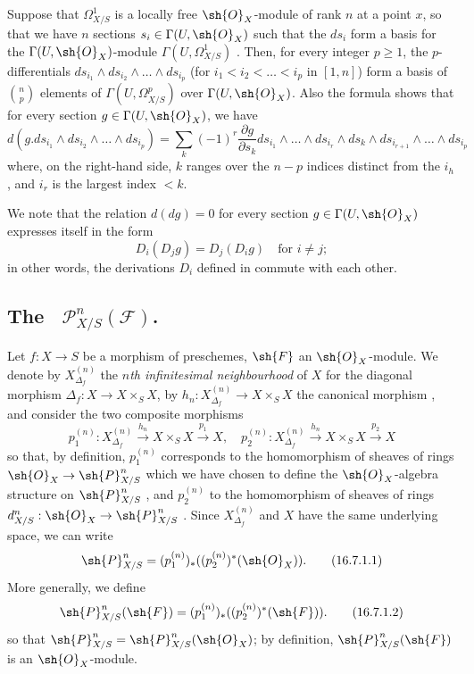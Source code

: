\begin{env}[16.6.5]
\label{IV.16.6.5}
Suppose that $\Omega_{X/S}^1$ is a locally free $\sh{O}_X$-module of rank $n$ at a point $x$, so that we have $n$ sections $s_i \in \Gamma(U, \sh{O}_X)$ such that the $ds_i$ form a basis for the $\Gamma(U, \sh{O}_X)$-module $\Gamma(U, \Omega_{X/S}^1)$ .
Then, for every integer $p \geq 1$, the $p$-differentials $ds_{i_1} \wedge ds_{i_2} \wedge \dots \wedge ds_{i_p}$ (for $i_1 < i_2 < \dots < i_p$ in $[1,n]$) form a basis of $\binom{n}{p}$ elements of $\Gamma(U, \Omega_{X/S}^p)$ over $\Gamma(U, \sh{O}_X)$.
Also the formula  shows that for every section $g \in \Gamma(U, \sh{O}_X)$, we have
\[
  \label{IV.16.6.5.1}
  d(g.ds_{i_1} \wedge ds_{i_2} \wedge \dots \wedge ds_{i_p}) = \sum_k (-1)^r \frac{\partial g}{\partial s_k} ds_{i_1} \wedge \dots \wedge ds_{i_r} \wedge ds_k \wedge ds_{i_{r+1}} \wedge \dots \wedge ds_{i_p}
  \tag{16.6.5.1}
\]
where, on the right-hand side, $k$ ranges over the $n-p$ indices distinct from the $i_h$, and $i_r$ is the largest index $<k$.

We note that the relation $d(dg) = 0$ for every section $g \in \Gamma(U, \sh{O}_X)$ expresses itself in the form
\[
  D_i(D_j g) = D_j(D_i g) \quad \text{for $i \neq j$};
\]
in other words, the derivations $D_i$ defined in  commute with each other.
\end{env}

\subsection{The ~$\mathcal{P}_{X/S}^n(\mathcal{F})$.}
\label{IV.16.7}

\begin{env}[16.7.1]
\label{IV.16.7.1}
Let $f:X \to S$ be a morphism of preschemes, $\sh{F}$ an $\sh{O}_X$-module.
We denote by $X_{\Delta_f}^{(n)}$ the \emph{$n$th infinitesimal neighbourhood} of $X$ for the diagonal morphism
$\Delta_f: X \to X \times_S X$, by $h_n:X_{\Delta_f}^{(n)} \to X \times_S X$ the canonical morphism , and consider the two composite morphisms
\[
  p_1^{(n)}:X_{\Delta_f}^{(n)} \xrightarrow{h_n} X \times_S X \xrightarrow{p_1} X, \quad 
  p_2^{(n)}:X_{\Delta_f}^{(n)} \xrightarrow{h_n} X \times_S X \xrightarrow{p_2} X
\]
so that, by definition, $p_1^{(n)}$ corresponds to the homomorphism of sheaves of rings $\sh{O}_X \to \sh{P}_{X/S}^n$ which we have chosen to define the $\sh{O}_X$-algebra structure on $\sh{P}_{X/S}^n$ , and $p_2^{(n)}$ to the homomorphism of sheaves of rings $d^n_{X/S}:\sh{O}_X \to \sh{P}_{X/S}^n$ .
Since $X_{\Delta_f}^{(n)}$ and $X$ have the same underlying space, we can write
\[
  \label{IV.16.7.1.1}
  \sh{P}_{X/S}^n = (p_1^{(n)})_* ((p_2^{(n)})^* (\sh{O}_X)).
  \tag{16.7.1.1}
\]
More generally, we define
\[
  \label{IV.16.7.1.2}
  \sh{P}_{X/S}^n(\sh{F}) = (p_1^{(n)})_* ((p_2^{(n)})^* (\sh{F})).
  \tag{16.7.1.2}
\]
so that $\sh{P}_{X/S}^n = \sh{P}_{X/S}^n(\sh{O}_X)$;
by definition, $\sh{P}_{X/S}^n(\sh{F})$ is an $\sh{O}_X$-module.
\end{env}

